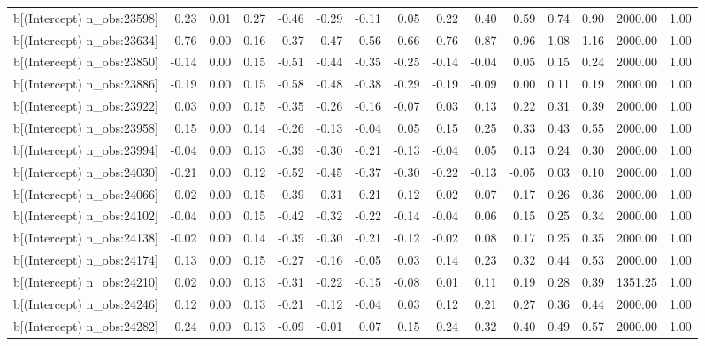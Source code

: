 \begin{table}[ht]
\begin{tabular}{rrrrrrrrrrrrrrr}
  b[(Intercept) n\_obs:23598] & 0.23 & 0.01 & 0.27 & -0.46 & -0.29 & -0.11 & 0.05 & 0.22 & 0.40 & 0.59 & 0.74 & 0.90 & 2000.00 & 1.00 \\ 
  b[(Intercept) n\_obs:23634] & 0.76 & 0.00 & 0.16 & 0.37 & 0.47 & 0.56 & 0.66 & 0.76 & 0.87 & 0.96 & 1.08 & 1.16 & 2000.00 & 1.00 \\ 
  b[(Intercept) n\_obs:23850] & -0.14 & 0.00 & 0.15 & -0.51 & -0.44 & -0.35 & -0.25 & -0.14 & -0.04 & 0.05 & 0.15 & 0.24 & 2000.00 & 1.00 \\ 
  b[(Intercept) n\_obs:23886] & -0.19 & 0.00 & 0.15 & -0.58 & -0.48 & -0.38 & -0.29 & -0.19 & -0.09 & 0.00 & 0.11 & 0.19 & 2000.00 & 1.00 \\ 
  b[(Intercept) n\_obs:23922] & 0.03 & 0.00 & 0.15 & -0.35 & -0.26 & -0.16 & -0.07 & 0.03 & 0.13 & 0.22 & 0.31 & 0.39 & 2000.00 & 1.00 \\ 
  b[(Intercept) n\_obs:23958] & 0.15 & 0.00 & 0.14 & -0.26 & -0.13 & -0.04 & 0.05 & 0.15 & 0.25 & 0.33 & 0.43 & 0.55 & 2000.00 & 1.00 \\ 
  b[(Intercept) n\_obs:23994] & -0.04 & 0.00 & 0.13 & -0.39 & -0.30 & -0.21 & -0.13 & -0.04 & 0.05 & 0.13 & 0.24 & 0.30 & 2000.00 & 1.00 \\ 
  b[(Intercept) n\_obs:24030] & -0.21 & 0.00 & 0.12 & -0.52 & -0.45 & -0.37 & -0.30 & -0.22 & -0.13 & -0.05 & 0.03 & 0.10 & 2000.00 & 1.00 \\ 
  b[(Intercept) n\_obs:24066] & -0.02 & 0.00 & 0.15 & -0.39 & -0.31 & -0.21 & -0.12 & -0.02 & 0.07 & 0.17 & 0.26 & 0.36 & 2000.00 & 1.00 \\ 
  b[(Intercept) n\_obs:24102] & -0.04 & 0.00 & 0.15 & -0.42 & -0.32 & -0.22 & -0.14 & -0.04 & 0.06 & 0.15 & 0.25 & 0.34 & 2000.00 & 1.00 \\ 
  b[(Intercept) n\_obs:24138] & -0.02 & 0.00 & 0.14 & -0.39 & -0.30 & -0.21 & -0.12 & -0.02 & 0.08 & 0.17 & 0.25 & 0.35 & 2000.00 & 1.00 \\ 
  b[(Intercept) n\_obs:24174] & 0.13 & 0.00 & 0.15 & -0.27 & -0.16 & -0.05 & 0.03 & 0.14 & 0.23 & 0.32 & 0.44 & 0.53 & 2000.00 & 1.00 \\ 
  b[(Intercept) n\_obs:24210] & 0.02 & 0.00 & 0.13 & -0.31 & -0.22 & -0.15 & -0.08 & 0.01 & 0.11 & 0.19 & 0.28 & 0.39 & 1351.25 & 1.00 \\ 
  b[(Intercept) n\_obs:24246] & 0.12 & 0.00 & 0.13 & -0.21 & -0.12 & -0.04 & 0.03 & 0.12 & 0.21 & 0.27 & 0.36 & 0.44 & 2000.00 & 1.00 \\ 
  b[(Intercept) n\_obs:24282] & 0.24 & 0.00 & 0.13 & -0.09 & -0.01 & 0.07 & 0.15 & 0.24 & 0.32 & 0.40 & 0.49 & 0.57 & 2000.00 & 1.00 \\ 

\end{tabular}
\end{table}
